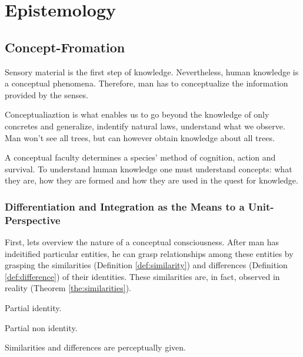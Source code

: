 \part{Epistemology}

\chapter{Concept-Fromation}

    Sensory material is the first step of knowledge. Nevertheless, human knowledge is a conceptual phenomena. Therefore, man has to conceptualize the information provided by the senses.

    Conceptualiaztion is what enables us to go beyond the knowledge of only concretes and generalize, indentify natural laws, understand what we observe. Man won't see all trees, but can however obtain knowledge about all trees.

    A conceptual faculty determines a species' method of cognition, action and survival. To understand human knowledge one must understand concepts: what they are, how they are formed and how they are used in the quest for knowledge.

    \section{Differentiation and Integration as the Means to a Unit-Perspective}

        First, lets overview the nature of a conceptual consciousness. After man has indeitified particular entities, he can grasp relationships among these entities by grasping the similarities (Definition \ref{def:similarity}) and differences (Definition \ref{def:difference}) of their identities. These similarities are, in fact, observed in reality (Theorem \ref{the:similarities}).

            \begin{definition}[Similarity]
            \label{def:similarity}
                Partial identity.
            \end{definition}

            \begin{definition}[Difference]
            \label{def:difference}
                Partial non identity.
            \end{definition}

            \begin{theorem}
            \label{the:similarities}
                Similarities and differences are perceptually given.
            \end{theorem}

